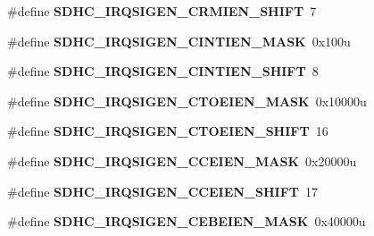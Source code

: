 \begin{DoxyCompactItemize}
\item 
\#define {\bfseries S\+D\+H\+C\+\_\+\+I\+R\+Q\+S\+I\+G\+E\+N\+\_\+\+C\+R\+M\+I\+E\+N\+\_\+\+S\+H\+I\+FT}~7\hypertarget{group__SDHC__Register__Masks_ga2a4ce3b87ba3791caee5355e441fc00b}{}\label{group__SDHC__Register__Masks_ga2a4ce3b87ba3791caee5355e441fc00b}

\item 
\#define {\bfseries S\+D\+H\+C\+\_\+\+I\+R\+Q\+S\+I\+G\+E\+N\+\_\+\+C\+I\+N\+T\+I\+E\+N\+\_\+\+M\+A\+SK}~0x100u\hypertarget{group__SDHC__Register__Masks_gad9ffbe51e814a8ece8a5c12e0ebd0ba3}{}\label{group__SDHC__Register__Masks_gad9ffbe51e814a8ece8a5c12e0ebd0ba3}

\item 
\#define {\bfseries S\+D\+H\+C\+\_\+\+I\+R\+Q\+S\+I\+G\+E\+N\+\_\+\+C\+I\+N\+T\+I\+E\+N\+\_\+\+S\+H\+I\+FT}~8\hypertarget{group__SDHC__Register__Masks_ga5dabd6ab59c1c4ab26de59aae2c42235}{}\label{group__SDHC__Register__Masks_ga5dabd6ab59c1c4ab26de59aae2c42235}

\item 
\#define {\bfseries S\+D\+H\+C\+\_\+\+I\+R\+Q\+S\+I\+G\+E\+N\+\_\+\+C\+T\+O\+E\+I\+E\+N\+\_\+\+M\+A\+SK}~0x10000u\hypertarget{group__SDHC__Register__Masks_ga244279ea7f9e5ef02942b303764ea87f}{}\label{group__SDHC__Register__Masks_ga244279ea7f9e5ef02942b303764ea87f}

\item 
\#define {\bfseries S\+D\+H\+C\+\_\+\+I\+R\+Q\+S\+I\+G\+E\+N\+\_\+\+C\+T\+O\+E\+I\+E\+N\+\_\+\+S\+H\+I\+FT}~16\hypertarget{group__SDHC__Register__Masks_gab06cfed0d752fd51ab5e2eea99832192}{}\label{group__SDHC__Register__Masks_gab06cfed0d752fd51ab5e2eea99832192}

\item 
\#define {\bfseries S\+D\+H\+C\+\_\+\+I\+R\+Q\+S\+I\+G\+E\+N\+\_\+\+C\+C\+E\+I\+E\+N\+\_\+\+M\+A\+SK}~0x20000u\hypertarget{group__SDHC__Register__Masks_ga3d875f5185d1fb805a87aa0c0737ded7}{}\label{group__SDHC__Register__Masks_ga3d875f5185d1fb805a87aa0c0737ded7}

\item 
\#define {\bfseries S\+D\+H\+C\+\_\+\+I\+R\+Q\+S\+I\+G\+E\+N\+\_\+\+C\+C\+E\+I\+E\+N\+\_\+\+S\+H\+I\+FT}~17\hypertarget{group__SDHC__Register__Masks_ga2bc72b9a24dfa8dbae34157775b493c7}{}\label{group__SDHC__Register__Masks_ga2bc72b9a24dfa8dbae34157775b493c7}

\item 
\#define {\bfseries S\+D\+H\+C\+\_\+\+I\+R\+Q\+S\+I\+G\+E\+N\+\_\+\+C\+E\+B\+E\+I\+E\+N\+\_\+\+M\+A\+SK}~0x40000u\hypertarget{group__SDHC__Register__Masks_ga200f2b394bdfd0e097f4ad4c496ff2d6}{}\label{group__SDHC__Register__Masks_ga200f2b394bdfd0e097f4ad4c496ff2d6}


\end{DoxyCompactItemize}

